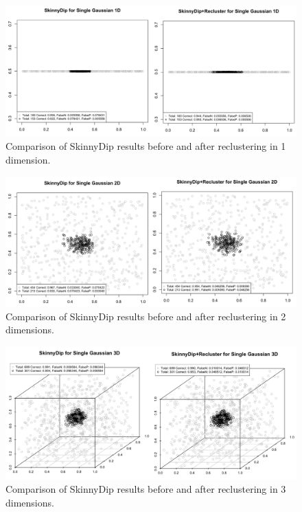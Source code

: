 \documentclass{sig-alternate-05-2015}
\begin{document}
\begin{figure}[t]
\centering
\includegraphics[width=\textwidth]{images/1Dcompare}
\caption{Comparison of SkinnyDip results before and after reclustering in 1 dimension.}
\label{fig:1Dcompare}
\end{figure}

\begin{figure}[t]
\centering
\includegraphics[width=\textwidth]{images/2Dcompare}
\caption{Comparison of SkinnyDip results before and after reclustering in 2 dimensions.}
\label{fig:2Dcompare}
\end{figure}

\begin{figure}[t]
\centering
\includegraphics[width=\textwidth]{images/3Dcompare}
\caption{Comparison of SkinnyDip results before and after reclustering in 3 dimensions.}
\label{fig:3Dcompare}
\end{figure}
\end{document}
